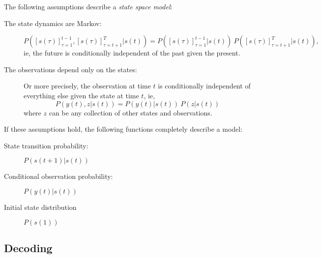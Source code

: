 \documentclass[12pt]{article}
\newcommand{\os}[4]{{\left[ #1(#2) \right]}_{#3}^{#4}} %
\newcommand{\ti}[2]{{#1}{(#2)}}                         %
\newcommand{\ts}[4]{\os{#1}{#2}{#2=#3}{#4}} %
\begin{document}
The following assumptions describe a \emph{state space model}:
\begin{description}
\item[The state dynamics are Markov:]
  \begin{equation}
    \label{eq:Markov}
    P(\ts{s}{\tau}{1}{t-1},\ts{s}{\tau}{t+1}{T}|\ti{s}{t}) =
    P(\ts{s}{\tau}{1}{t-1}|\ti{s}{t}) ~ P(\ts{s}{\tau}{t+1}{T}|\ti{s}{t}),
  \end{equation}
  ie, the future is conditionally independent of the past given the present.
\item[The observations depend only on the states:] Or more precisely,
  the observation at time $t$ is conditionally independent of
  everything else given the state at time $t$, ie,
  \begin{equation}
    \label{eq:IndependentY}
    P(\ti{y}{t},z|\ti{s}{t}) =  P(\ti{y}{t}|\ti{s}{t}) ~  P(z|\ti{s}{t})
  \end{equation}
  where $z$ can be any collection of other states and observations.
\end{description}
If these assumptions hold, the following functions completely describe
a model:
\begin{description}
\item[State transition probability:] $P(\ti{s}{t+1}|\ti{s}{t})$
\item[Conditional observation probability:] $P(\ti{y}{t}|\ti{s}{t})$
\item[Initial state distribution] $P(\ti{s}{1})$
\end{description}

\subsection*{Decoding}
\label{sec:decoding}
\end{document}
